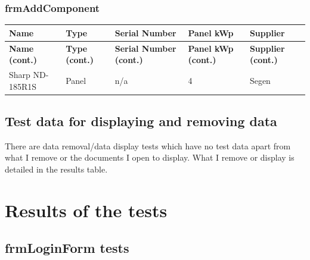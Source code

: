 \subsubsection{frmAddComponent}

\begin{longtable}{ | p{4cm} | p{3cm} | p{4cm} | p{2cm} | p{3cm} | }
	\hline
	\textbf{Name} & \textbf{Type} & \textbf{Serial Number} & \textbf{Panel kWp} & \textbf{Supplier}\\
	\endfirsthead
	\hline
	\textbf{Name (cont.)} & \textbf{Type (cont.)} & \textbf{Serial Number (cont.)} & \textbf{Panel kWp (cont.)} & \textbf{Supplier (cont.)}\\
	\endhead
	\hline
	Sharp ND-185R1S & Panel & n\slash a & 4 & Segen\\
	\hline
\end{longtable}

\subsection{Test data for displaying and removing data}

There are data removal\slash data display tests which have no test data apart from what I remove or the documents I open to display.  What I remove or display is detailed in the results table.

\section{Results of the tests}

\subsection{frmLoginForm tests}

